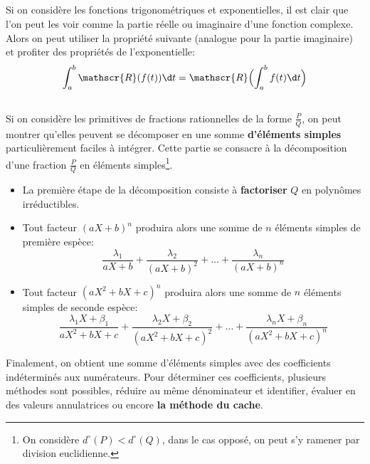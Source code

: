 \subsection*{}
Si on considère les fonctions trigonométriques et exponentielles, il est clair que l'on peut les voir comme la partie réelle ou imaginaire d'une fonction complexe.\+
Alors on peut utiliser la propriété suivante (analogue pour la partie imaginaire) et profiter des propriétés de l'exponentielle:
\[
   \int_{a}^{b} \mathscr{R}(f(t)) \d t = \mathscr{R}\Bigl(\int_{a}^{b} f(t) \d t\Bigl) 
\]

\subsection*{}

Si on considère les primitives de fractions rationnelles de la forme \(\frac{P}{Q}\), on peut montrer qu'elles peuvent se décomposer en une somme \textbf{d'éléments simples} particulièrement faciles à intégrer. Cette partie se consacre à la décomposition d'une fraction \(\frac{P}{Q}\) en éléments simples\footnote[3]{On considère \(d^{\circ}(P) < d^{\circ}(Q)\), dans le cas opposé, on peut s'y ramener par division euclidienne.}.
\begin{center}
   \begin{itemize}
      \item La première étape de la décomposition consiste à \textbf{factoriser} \(Q\) en polynômes irréductibles.
      \item Tout facteur \((aX + b)^n\) produira alors une somme de \(n\) éléments simples de première espèce:
      \[
         \frac{\lambda_1}{aX+b} + \frac{\lambda_2}{(aX+b)^2} + \ldots + \frac{\lambda_n}{(aX+b)^n}
      \] 
      \item Tout facteur \((aX^2 + bX + c)^n\) produira alors une somme de \(n\) éléments simples de seconde espèce:
      \[
         \frac{\lambda_1X+\beta_1}{aX^2+bX+c} + \frac{\lambda_2X+\beta_2}{(aX^2+bX+c)^2} + \ldots + \frac{\lambda_nX+\beta_n}{(aX^2+bX+c)^n}
      \]
   \end{itemize}
\end{center}

Finalement, on obtient une somme d'éléments simples avec des coefficients indéterminés aux numérateurs. Pour déterminer ces coefficients, plusieurs méthodes sont possibles, réduire au même dénominateur et identifier, évaluer en des valeurs annulatrices ou encore \textbf{la méthode du cache}.\< 

